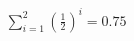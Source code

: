 \documentclass[preview]{standalone}
\begin{document}
\begin{align*}
\sum_{i=1}^{2} (\frac{1}{2})^i = {0.75}
\end{align*}
\end{document}
